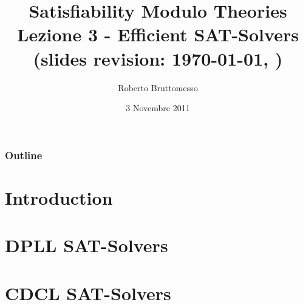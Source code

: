 \documentclass[xcolor=dvipsnames
              ]{beamer}
\title[SAT-Solvers]{Satisfiability Modulo Theories\\ Lezione 3 - Efficient SAT-Solvers \\ {\tiny (slides revision: \today, \currenttime)}}
\author[R. Bruttomesso]{\large Roberto Bruttomesso}
\date{3 Novembre 2011}
\institute[SMT]{\large Seminario di Logica Matematica \\(Corso Prof. Silvio Ghilardi)}
\begin{document}
\frame{\titlepage}



\begin{frame}
  \frametitle{Outline}
  \tableofcontents
\end{frame}

\section{Introduction}


\section{DPLL SAT-Solvers}


\section{CDCL SAT-Solvers}


\end{document}
